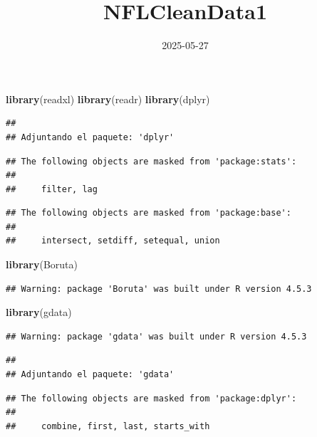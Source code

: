 \documentclass[
]{article}
\title{NFLCleanData1}
\author{}
\date{\vspace{-2.5em}2025-05-27}
\newenvironment{Shaded}{\begin{snugshade}}{\end{snugshade}}
\newcommand{\FunctionTok}[1]{\textcolor[rgb]{0.13,0.29,0.53}{\textbf{#1}}}
\newcommand{\NormalTok}[1]{#1}
\begin{document}
\maketitle

\begin{Shaded}
\begin{Highlighting}[]
\FunctionTok{library}\NormalTok{(readxl)}
\FunctionTok{library}\NormalTok{(readr)}
\FunctionTok{library}\NormalTok{(dplyr)}
\end{Highlighting}
\end{Shaded}

\begin{verbatim}
## 
## Adjuntando el paquete: 'dplyr'
\end{verbatim}

\begin{verbatim}
## The following objects are masked from 'package:stats':
## 
##     filter, lag
\end{verbatim}

\begin{verbatim}
## The following objects are masked from 'package:base':
## 
##     intersect, setdiff, setequal, union
\end{verbatim}

\begin{Shaded}
\begin{Highlighting}[]
\FunctionTok{library}\NormalTok{(Boruta)}
\end{Highlighting}
\end{Shaded}

\begin{verbatim}
## Warning: package 'Boruta' was built under R version 4.5.3
\end{verbatim}

\begin{Shaded}
\begin{Highlighting}[]
\FunctionTok{library}\NormalTok{(gdata)}
\end{Highlighting}
\end{Shaded}

\begin{verbatim}
## Warning: package 'gdata' was built under R version 4.5.3
\end{verbatim}

\begin{verbatim}
## 
## Adjuntando el paquete: 'gdata'
\end{verbatim}

\begin{verbatim}
## The following objects are masked from 'package:dplyr':
## 
##     combine, first, last, starts_with
\end{verbatim}
\end{document}
